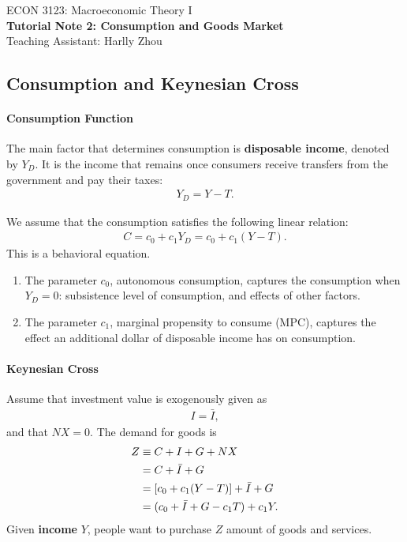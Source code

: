 \documentclass[12pt]{article}
\begin{document}
\begin{center}
    ECON 3123: Macroeconomic Theory I\\
    {\large \textbf{Tutorial Note 2: Consumption and Goods Market}}\\
    Teaching Assistant: Harlly Zhou
\end{center}



\subsection*{Consumption and Keynesian Cross}
\paragraph{Consumption Function}
The main factor that determines consumption is \textbf{disposable income}, denoted by $Y_D$. It is the income that remains once consumers receive transfers from the government and pay their taxes:
\begin{align*}
    Y_D = Y - T.
\end{align*}

We assume that the consumption satisfies the following linear relation:
\begin{align*}
    C = c_0 + c_1 Y_D = c_0 + c_1 (Y-T).
\end{align*}
This is a behavioral equation. 
\begin{enumerate}
    \item The parameter $c_0$, autonomous consumption, captures the consumption when $Y_D=0$: subsistence level of consumption, and effects of other factors.
    \item The parameter $c_1$, marginal propensity to consume (MPC),
    captures the effect an additional dollar of disposable income has on consumption.
\end{enumerate}

\paragraph{Keynesian Cross}
Assume that investment value is exogenously given as
\begin{align*}
    I = \bar{I},
\end{align*}
and that $NX=0$. 
The demand for goods is
\begin{align}\label{eq:demand_v1}
    Z &\equiv C + I + G + NX \notag \\
    &= C + \bar{I} + G \notag \\
    &= [c_0 + c_1(Y-T)] + \bar{I} + G \notag \\
    &= (c_0 + \bar{I} + G - c_1T) + c_1Y.
\end{align}
Given \textbf{income} $Y$, people want to purchase $Z$ amount of goods and services.
\end{document}

